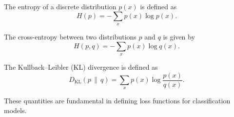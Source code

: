 The entropy of a discrete distribution $p(x)$ is defined as
\[
    H(p) = -\sum_x p(x) \log p(x).
\]

The cross-entropy between two distributions $p$ and $q$ is given by
\[
    H(p, q) = -\sum_x p(x) \log q(x).
\]

The Kullback--Leibler (KL) divergence is defined as
\[
    D_{\mathrm{KL}}(p \,\|\, q) = \sum_x p(x) \log \frac{p(x)}{q(x)}.
\]

These quantities are fundamental in defining loss functions for classification models.



